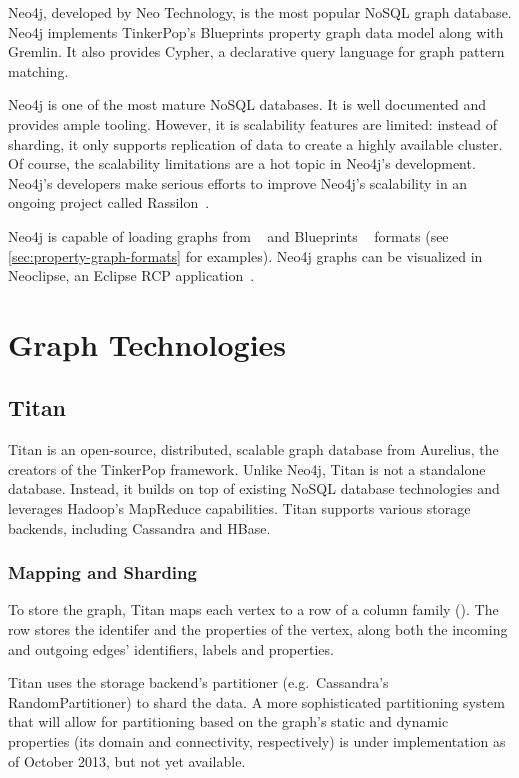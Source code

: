 Neo4j, developed by Neo Technology, is the most popular NoSQL graph database. Neo4j implements TinkerPop's Blueprints property graph data model along with Gremlin. It also provides Cypher, a declarative query language for graph pattern matching. 

Neo4j is one of the most mature NoSQL databases. It is well documented and provides ample tooling. However, it is scalability features are limited: instead of sharding, it only supports replication of data to create a highly available cluster. Of course, the scalability limitations are a hot topic in Neo4j's development. Neo4j's developers make serious efforts to improve Neo4j's scalability in an ongoing project called Rassilon~\cite{rassilon}.

Neo4j is capable of loading graphs from \graphml{}~\cite{GraphML} and Blueprints \graphson{}~\cite{BlueprintsGraphSON} formats (see \autoref{sec:property-graph-formats} for examples). Neo4j graphs can be visualized in Neoclipse, an Eclipse RCP application~\cite{Neoclipse}. %

\section{Graph Technologies}

\subsection{Titan}
\label{subsec:titan}

Titan is an open-source, distributed, scalable graph database from Aurelius, the creators of the TinkerPop framework. Unlike Neo4j, Titan is not a standalone database. Instead, it builds on top of existing NoSQL database technologies and leverages Hadoop's MapReduce capabilities. Titan supports various storage backends, including Cassandra and HBase.

\subsubsection{Mapping and Sharding}

To store the graph, Titan maps each vertex to a row of a column family (). The row stores the identifer and the properties of the vertex, along both the incoming and outgoing edges' identifiers, labels and properties.

Titan uses the storage backend's partitioner (e.g.\ Cassandra's RandomPartitioner) to shard the data. A more sophisticated partitioning system that will allow for partitioning based on the graph's static and dynamic properties (its domain and connectivity, respectively) is under implementation as of October 2013, but not yet available.

